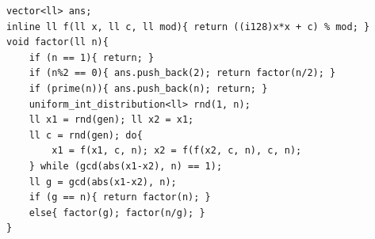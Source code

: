 \begin{verbatim}
vector<ll> ans;
inline ll f(ll x, ll c, ll mod){ return ((i128)x*x + c) % mod; }
void factor(ll n){
	if (n == 1){ return; }
	if (n%2 == 0){ ans.push_back(2); return factor(n/2); }
	if (prime(n)){ ans.push_back(n); return; }
	uniform_int_distribution<ll> rnd(1, n);
	ll x1 = rnd(gen); ll x2 = x1;
	ll c = rnd(gen); do{
		x1 = f(x1, c, n); x2 = f(f(x2, c, n), c, n);
	} while (gcd(abs(x1-x2), n) == 1);
	ll g = gcd(abs(x1-x2), n);
	if (g == n){ return factor(n); }
	else{ factor(g); factor(n/g); }
}
\end{verbatim}